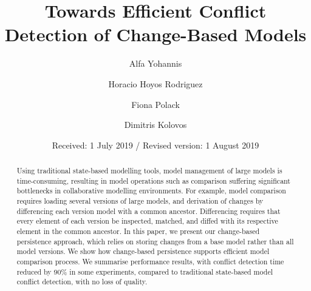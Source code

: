 
\renewcommand{\labelitemi}{$\bullet$}
\newcommand{\AndA}{\textnormal{\textbf{and }}}
\newcommand{\Is}{\textnormal{\textbf{is }}}
\newcommand{\Not}{\textnormal{\textbf{not }}}
\newcommand{\In}{\textnormal{\textbf{in }}}
\newcommand{\Or}{\textnormal{\textbf{or }}}
\newcommand{\eqnum}{\refstepcounter{equation}\textup{\tagform@{\theequation}}}

%
%

%
\title{Towards Efficient Conflict Detection of Change-Based Models}
\author{Alfa Yohannis \and Horacio Hoyos Rodriguez \and Fiona Polack \and Dimitris Kolovos%
}                     %
%
\offprints{}          %
%
%
\date{Received: 1 July 2019 / Revised version: 1 August 2019}
%
\maketitle
%
\begin{abstract}
  Using traditional state-based modelling tools, model management of large models is time-consuming, resulting in model operations such as comparison suffering significant bottlenecks in collaborative modelling environments.  For example, model comparison requires loading several versions of large models, and derivation of changes by differencing each version model with a common ancestor.  Differencing requires that every element of each version be inspected, matched, and diffed with its respective element in the common ancestor. In this paper, we present our change-based persistence approach, which relies on storing changes from a base model rather than all model versions.  We show how change-based persistence supports efficient model comparison process. We summarise performance results, with conflict detection time reduced by 90\% in some experiments, compared to traditional state-based model conflict detection, with no loss of quality.
\end{abstract}
%

